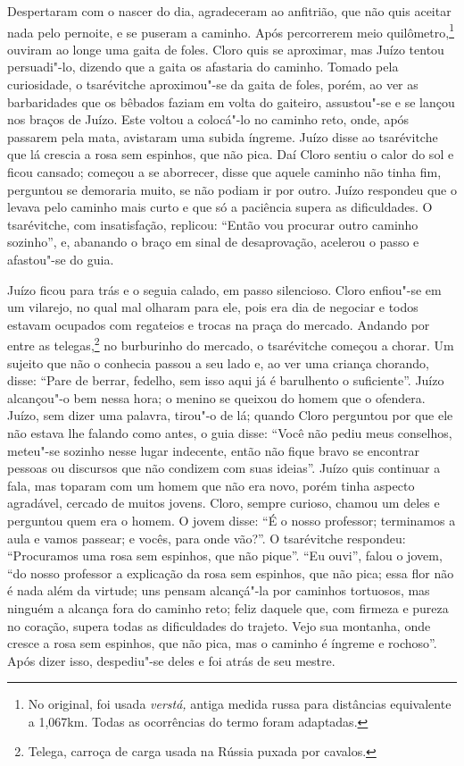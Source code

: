 Despertaram com o nascer do dia, agradeceram ao anfitrião, que não quis
aceitar nada pelo pernoite, e se puseram a caminho. Após percorrerem
meio quilômetro,\footnote{No original, foi usada \emph{verstá,} antiga
  medida russa para distâncias equivalente a 1,067km. Todas as
  ocorrências do termo foram adaptadas.} ouviram ao longe uma gaita de
foles. Cloro quis se aproximar, mas Juízo tentou persuadi"-lo, dizendo
que a gaita os afastaria do caminho. Tomado pela curiosidade, o
tsarévitche aproximou"-se da gaita de foles, porém, ao ver as
barbaridades que os bêbados faziam em volta do gaiteiro, assustou"-se e
se lançou nos braços de Juízo. Este voltou a colocá"-lo no caminho reto,
onde, após passarem pela mata, avistaram uma subida íngreme. Juízo disse
ao tsarévitche que lá crescia a rosa sem espinhos, que não pica. Daí
Cloro sentiu o calor do sol e ficou cansado; começou a se aborrecer,
disse que aquele caminho não tinha fim, perguntou se demoraria muito, se
não podiam ir por outro. Juízo respondeu que o levava pelo caminho mais
curto e que só a paciência supera as dificuldades. O tsarévitche, com
insatisfação, replicou: ``Então vou procurar outro caminho sozinho'', e,
abanando o braço em sinal de desaprovação, acelerou o passo e afastou"-se
do guia.

Juízo ficou para trás e o seguia calado, em passo silencioso. Cloro
enfiou"-se em um vilarejo, no qual mal olharam para ele, pois era dia de
negociar e todos estavam ocupados com regateios e trocas na praça do
mercado. Andando por entre as telegas,\footnote{Telega, carroça de carga
  usada na Rússia puxada por cavalos.} no burburinho do mercado, o
tsarévitche começou a chorar. Um sujeito que não o conhecia passou a seu
lado e, ao ver uma criança chorando, disse: ``Pare de berrar, fedelho,
sem isso aqui já é barulhento o suficiente''. Juízo alcançou"-o bem nessa
hora; o menino se queixou do homem que o ofendera. Juízo, sem dizer uma
palavra, tirou"-o de lá; quando Cloro perguntou por que ele não estava
lhe falando como antes, o guia disse: ``Você não pediu meus conselhos,
meteu"-se sozinho nesse lugar indecente, então não fique bravo se
encontrar pessoas ou discursos que não condizem com suas ideias''. Juízo
quis continuar a fala, mas toparam com um homem que não era novo, porém
tinha aspecto agradável, cercado de muitos jovens. Cloro, sempre
curioso, chamou um deles e perguntou quem era o homem. O jovem disse:
``É o nosso professor; terminamos a aula e vamos passear; e vocês, para
onde vão?''. O tsarévitche respondeu: ``Procuramos uma rosa sem
espinhos, que não pique''. ``Eu ouvi'', falou o jovem, ``do nosso
professor a explicação da rosa sem espinhos, que não pica; essa flor não
é nada além da virtude; uns pensam alcançá"-la por caminhos tortuosos,
mas ninguém a alcança fora do caminho reto; feliz daquele que, com
firmeza e pureza no coração, supera todas as dificuldades do trajeto.
Vejo sua montanha, onde cresce a rosa sem espinhos, que não pica, mas o
caminho é íngreme e rochoso''. Após dizer isso, despediu"-se deles e foi
atrás de seu mestre.

